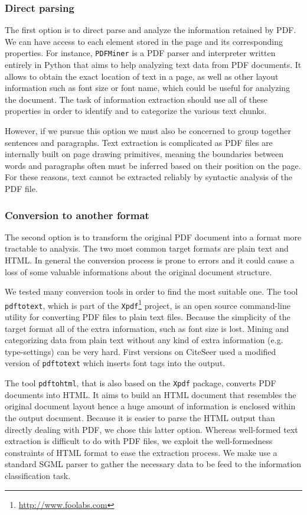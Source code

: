 \subsubsection{Direct parsing}
The first option is to direct parse and analyze the information retained by PDF. We can have access to each element stored in the page and its corresponding properties. For instance, \texttt{PDFMiner} is a PDF parser and interpreter written entirely in Python that aims to help analyzing text data from PDF documents. It allows to obtain the exact location of text in a page, as well as other layout information such as font size or font name, which could be useful for analyzing the document. The task of information extraction should use all of these properties in order to identify and to categorize the various text chunks.

However, if we pursue this option we must also be concerned to group together sentences and paragraphs. Text extraction is complicated as PDF files are internally built on page drawing primitives, meaning the boundaries between words and paragraphs often must be inferred based on their position on the page. For these reasons, text cannot be extracted reliably by syntactic analysis of the PDF file.

\subsubsection{Conversion to another format}
The second option is to transform the original PDF document into a format more tractable to analysis. The two most common target formats are plain text and HTML. In general the conversion process is prone to errors and it could cause a loss of some valuable informations about the original document structure.

We tested many conversion tools in order to find the most suitable one. The tool \texttt{pdftotext}, which is part of the \texttt{Xpdf}\footnote{\url{http://www.foolabs.com}} project, is an open source command-line utility for converting PDF files to plain text files. Because the simplicity of the target format all of the extra information, such as font size is lost. Mining and categorizing data from plain text without any kind of extra information (e.g. type-settings) can be very hard. First versions on CiteSeer \cite{giles1998cac} used a modified version of \texttt{pdftotext} which inserts font tags into the output.

The tool \texttt{pdftohtml}, that is also based on the \texttt{Xpdf} package, converts PDF documents into HTML. It aims to build an HTML document that resembles the original document layout hence a huge amount of information is enclosed within the output document. Because it is easier to parse the HTML output than directly dealing with PDF, we chose this latter option. Whereas well-formed text extraction is difficult to do with PDF files, we exploit the well-formedness constraints of HTML format to ease the extraction process. We make use a standard SGML parser to gather the necessary data to be feed to the information classification task.

